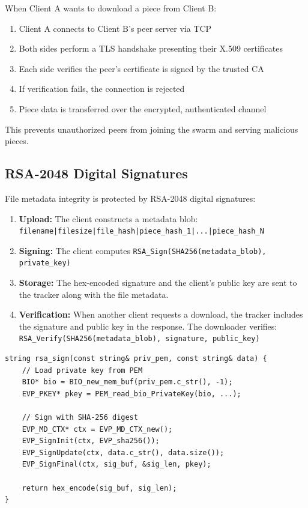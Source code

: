 \documentclass[12pt,a4paper]{article}
\begin{document}
When Client A wants to download a piece from Client B:

\begin{enumerate}
    \item Client A connects to Client B's peer server via TCP
    \item Both sides perform a TLS handshake presenting their X.509 certificates
    \item Each side verifies the peer's certificate is signed by the trusted CA
    \item If verification fails, the connection is rejected
    \item Piece data is transferred over the encrypted, authenticated channel
\end{enumerate}

This prevents unauthorized peers from joining the swarm and serving malicious pieces.

\subsection{RSA-2048 Digital Signatures}

File metadata integrity is protected by RSA-2048 digital signatures:

\begin{enumerate}
    \item \textbf{Upload:} The client constructs a metadata blob: \\
    \texttt{filename|filesize|file\_hash|piece\_hash\_1|...|piece\_hash\_N}
    
    \item \textbf{Signing:} The client computes \texttt{RSA\_Sign(SHA256(metadata\_blob), private\_key)}
    
    \item \textbf{Storage:} The hex-encoded signature and the client's public key are sent to the tracker along with the file metadata.
    
    \item \textbf{Verification:} When another client requests a download, the tracker includes the signature and public key in the response. The downloader verifies: \\
    \texttt{RSA\_Verify(SHA256(metadata\_blob), signature, public\_key)}
\end{enumerate}

\begin{lstlisting}[caption={RSA-2048 Digital Signature},label=lst:rsa-sign]
string rsa_sign(const string& priv_pem, const string& data) {
    // Load private key from PEM
    BIO* bio = BIO_new_mem_buf(priv_pem.c_str(), -1);
    EVP_PKEY* pkey = PEM_read_bio_PrivateKey(bio, ...);
    
    // Sign with SHA-256 digest
    EVP_MD_CTX* ctx = EVP_MD_CTX_new();
    EVP_SignInit(ctx, EVP_sha256());
    EVP_SignUpdate(ctx, data.c_str(), data.size());
    EVP_SignFinal(ctx, sig_buf, &sig_len, pkey);
    
    return hex_encode(sig_buf, sig_len);
}
\end{lstlisting}
\end{document}
